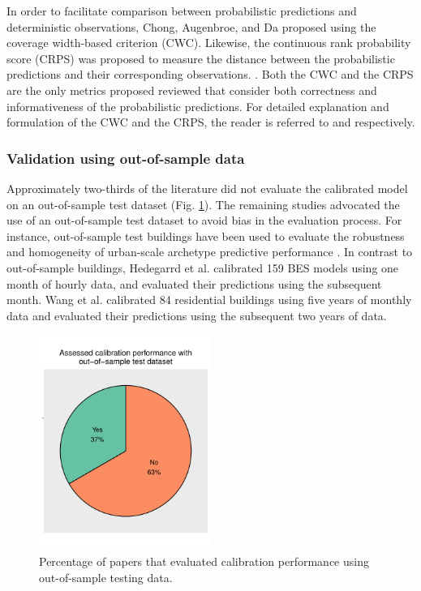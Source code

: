 \documentclass[review]{elsarticle}
\begin{document}
In order to facilitate comparison between probabilistic predictions and deterministic observations, Chong, Augenbroe, and Da \cite{chong2021occupancy} proposed using the coverage width-based criterion (CWC). Likewise, the continuous rank probability score (CRPS) was proposed to measure the distance between the probabilistic predictions and their corresponding observations. \cite{li2016assessment}. Both the CWC and the CRPS are the only metrics proposed reviewed that consider both correctness and informativeness of the probabilistic predictions. For detailed explanation and formulation of the CWC and the CRPS, the reader is referred to \cite{chong2021occupancy} and \cite{gneiting2007strictly} respectively. 

\subsubsection{Validation using out-of-sample data}

Approximately two-thirds of the literature did not evaluate the calibrated model on an out-of-sample test dataset (Fig. \ref{fig:test}). The remaining studies advocated the use of an out-of-sample test dataset to avoid bias in the evaluation process. For instance, out-of-sample test buildings have been used to evaluate the robustness and homogeneity of urban-scale archetype predictive performance \cite{kristensen2018hierarchical, sokol2017validation, kristensen2020long}. In contrast to out-of-sample buildings, Hedegarrd et al. \cite{hedegaard2019bottom} calibrated 159 BES models using one month of hourly data, and evaluated their predictions using the subsequent month. Wang et al. \cite{wang2020bayesian} calibrated 84 residential buildings using five years of monthly data and evaluated their predictions using the subsequent two years of data.

\begin{figure}[!h]
\centering
\includegraphics[width=0.5\textwidth]{figures/test_data.pdf}
\caption{Percentage of papers that evaluated calibration performance using out-of-sample testing data.}
\label{fig:test}
\end{figure}
\end{document}

